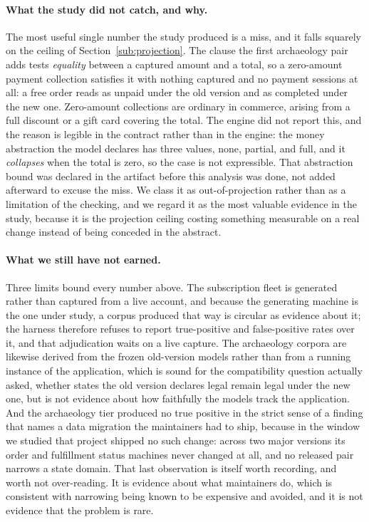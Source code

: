 \documentclass[11pt]{article}
\begin{document}
\paragraph{What the study did not catch, and why.} The most useful single number
the study produced is a miss, and it falls squarely on the ceiling of
Section~\ref{sub:projection}. The clause the first archaeology pair adds tests
\emph{equality} between a captured amount and a total, so a zero-amount payment
collection satisfies it with nothing captured and no payment sessions at all: a
free order reads as unpaid under the old version and as completed under the new
one. Zero-amount collections are ordinary in commerce, arising from a full
discount or a gift card covering the total. The engine did not report this, and
the reason is legible in the contract rather than in the engine: the money
abstraction the model declares has three values, none, partial, and full, and it
\emph{collapses} when the total is zero, so the case is not expressible. That
abstraction bound was declared in the artifact before this analysis was done, not
added afterward to excuse the miss. We class it as out-of-projection rather than
as a limitation of the checking, and we regard it as the most valuable evidence
in the study, because it is the projection ceiling costing something measurable
on a real change instead of being conceded in the abstract.

\paragraph{What we still have not earned.} Three limits bound every number above.
The subscription fleet is generated rather than captured from a live account, and
because the generating machine is the one under study, a corpus produced that way
is circular as evidence about it; the harness therefore refuses to report
true-positive and false-positive rates over it, and that adjudication waits on a
live capture. The archaeology corpora are likewise derived from the frozen
old-version models rather than from a running instance of the application, which
is sound for the compatibility question actually asked, whether states the old
version declares legal remain legal under the new one, but is not evidence about
how faithfully the models track the application. And the archaeology tier
produced no true positive in the strict sense of a finding that names a data
migration the maintainers had to ship, because in the window we studied that
project shipped no such change: across two major versions its order and
fulfillment status machines never changed at all, and no released pair narrows a
state domain. That last observation is itself worth recording, and worth not
over-reading. It is evidence about what maintainers do, which is consistent with
narrowing being known to be expensive and avoided, and it is not evidence that
the problem is rare.
\end{document}
